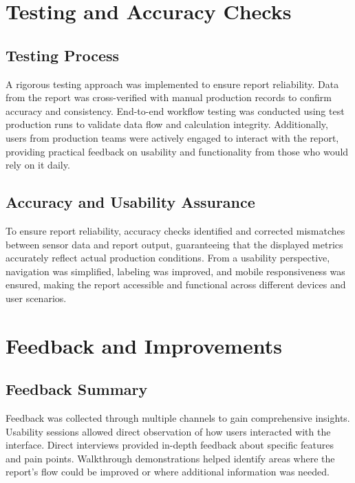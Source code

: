 \documentclass[a4paper,12pt]{article}
\begin{document}
\section{Testing and Accuracy Checks}

\subsection{Testing Process}

A rigorous testing approach was implemented to ensure report reliability. Data from the report was cross-verified with manual production records to confirm accuracy and consistency. End-to-end workflow testing was conducted using test production runs to validate data flow and calculation integrity. Additionally, users from production teams were actively engaged to interact with the report, providing practical feedback on usability and functionality from those who would rely on it daily.

\subsection{Accuracy and Usability Assurance}

To ensure report reliability, accuracy checks identified and corrected mismatches between sensor data and report output, guaranteeing that the displayed metrics accurately reflect actual production conditions. From a usability perspective, navigation was simplified, labeling was improved, and mobile responsiveness was ensured, making the report accessible and functional across different devices and user scenarios.

\section{Feedback and Improvements}

\subsection{Feedback Summary}

Feedback was collected through multiple channels to gain comprehensive insights. Usability sessions allowed direct observation of how users interacted with the interface. Direct interviews provided in-depth feedback about specific features and pain points. Walkthrough demonstrations helped identify areas where the report's flow could be improved or where additional information was needed.
\end{document}

